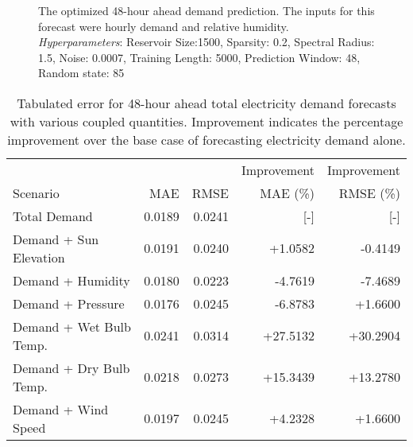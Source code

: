 \begin{figure*}[h]
  \centering
  
  \caption{The optimized 48-hour ahead demand prediction. The inputs for this forecast were hourly demand and relative humidity. \textit{Hyperparameters}:  Reservoir Size:1500, Sparsity: 0.2, Spectral Radius: 1.5, Noise: 0.0007, Training Length: 5000, Prediction Window: 48, Random state: 85}
  \label{fig:48demand}
\end{figure*}

  \begin{table*}[h]
    \centering
    \caption{Tabulated error for 48-hour ahead total electricity demand forecasts with various coupled quantities. Improvement indicates the percentage improvement over the base case of forecasting electricity demand alone.}
    \label{tab:demand48}
    \begin{tabular}{l|r|r|r|r}
      &  & & Improvement & Improvement \\
      Scenario  & MAE & RMSE & MAE (\%) & RMSE (\%)\\
      \hline
      Total Demand & 0.0189 & 0.0241 & [-] & [-] \\
      Demand + Sun Elevation & 0.0191 & 0.0240 & +1.0582 & -0.4149 \\
      Demand + Humidity & 0.0180 & 0.0223 & -4.7619 & -7.4689 \\
      Demand + Pressure & 0.0176 & 0.0245 & -6.8783 & +1.6600 \\
      Demand + Wet Bulb Temp. & 0.0241 & 0.0314 & +27.5132 & +30.2904 \\
      Demand + Dry Bulb Temp. & 0.0218 & 0.0273 & +15.3439 & +13.2780 \\
      Demand + Wind Speed & 0.0197 & 0.0245 & +4.2328 & +1.6600 \\
    \end{tabular}
  \end{table*}
